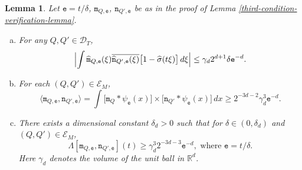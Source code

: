 \documentclass[a4paper,11pt]{amsart}
\newtheorem{lem}[thm]{\bf Lemma}
\numberwithin{equation}{section}
\begin{document}
\begin{lem} \label{QQ'e-lemma}
Let $\mathtt e = t/\delta$, $\mathtt m_{Q, \mathtt e}$, $\mathtt n_{Q', \mathtt e}$ be as in the proof of Lemma \ref{third-condition-verification-lemma}.  
\begin{enumerate}[(a)] 
\item For any $Q, Q' \in \mathscr{D}_T$, 
\begin{equation}
\Bigl| \int \widehat{\mathtt m}_{Q, \mathtt e}(\xi) \overline{\widehat{\mathtt n}_{Q', \mathtt e}(\xi)} \bigl[ 1 - \widehat{\sigma}(t \xi) \bigr] \, d\xi \Bigr| \leq \gamma_d 2^{d+1}\delta \mathtt e^{-d}.  \label{QQ'-parta-eqn} \end{equation}  \label{QQ'-parta}  
\vskip0.1in 
\item For each $(Q, Q') \in \mathscr{E}_M$, 
\begin{equation} \label{QQ'e}
\langle \mathtt m_{Q, \mathtt e}, \mathtt n_{Q', \mathtt e}\rangle = \int \bigl[ \mathtt m_{Q} \ast \psi_{\mathtt e}(x) \bigr] \times \bigl[ \mathtt n_{Q'} \ast \psi_{\mathtt e}(x) \bigr] \, dx \geq 2^{-3d-2} \gamma_d^{3} \mathtt e^{-d}. 
\end{equation} \label{QQ'-partb}
\item There exists a dimensional constant $\delta_d > 0$ such that for $\delta \in (0, \delta_d)$ and $(Q, Q') \in \mathscr{E}_M$, 
\begin{equation} \Lambda[\mathtt m_{Q, \mathtt e}, \mathtt n_{Q', \mathtt e}](t) \geq \gamma_d^{3} 2^{-3d-3} \mathtt e^{-d}, \text{ where } \mathtt e = t/\delta. \label{QQ'-partc-eqn} \end{equation} \label{QQ'-partc}
Here $\gamma_d$ denotes the volume of the unit ball in $\mathbb R^d$. 
\end{enumerate}
\end{lem}
\end{document}
